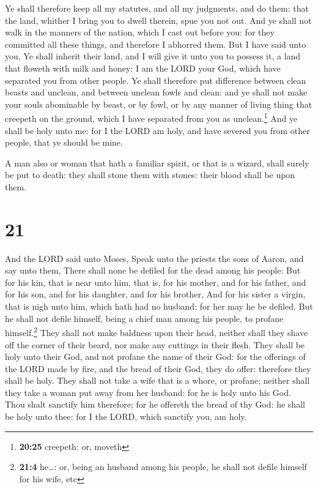  Ye shall therefore keep all my statutes, and all my
judgments, and do them: that the land, whither I bring you to dwell
therein, spue you not out.  And ye shall not walk in the
manners of the nation, which I cast out before you: for they committed
all these things, and therefore I abhorred them.  But I
have said unto you, Ye shall inherit their land, and I will give it unto
you to possess it, a land that floweth with milk and honey: I am the
LORD your God, which have separated you from other people.
 Ye shall therefore put difference between clean beasts
and unclean, and between unclean fowls and clean: and ye shall not make
your souls abominable by beast, or by fowl, or by any manner of living
thing that creepeth on the ground, which I have separated from you as
unclean.\footnote{\textbf{20:25} creepeth: or, moveth} 
And ye shall be holy unto me: for I the LORD am holy, and have severed
you from other people, that ye should be mine.

 A man also or woman that hath a familiar spirit, or that
is a wizard, shall surely be put to death: they shall stone them with
stones: their blood shall be upon them.

\hypertarget{section-20}{%
\section{21}\label{section-20}}

 And the LORD said unto Moses, Speak unto the priests the
sons of Aaron, and say unto them, There shall none be defiled for the
dead among his people:  But for his kin, that is near unto
him, that is, for his mother, and for his father, and for his son, and
for his daughter, and for his brother,  And for his sister
a virgin, that is nigh unto him, which hath had no husband; for her may
he be defiled.  But he shall not defile himself, being a
chief man among his people, to profane himself.\footnote{\textbf{21:4}
  he\ldots: or, being an husband among his people, he shall not defile
  himself for his wife, etc}  They shall not make baldness
upon their head, neither shall they shave off the corner of their beard,
nor make any cuttings in their flesh.  They shall be holy
unto their God, and not profane the name of their God: for the offerings
of the LORD made by fire, and the bread of their God, they do offer:
therefore they shall be holy.  They shall not take a wife
that is a whore, or profane; neither shall they take a woman put away
from her husband: for he is holy unto his God.  Thou shalt
sanctify him therefore; for he offereth the bread of thy God: he shall
be holy unto thee: for I the LORD, which sanctify you, am holy.

